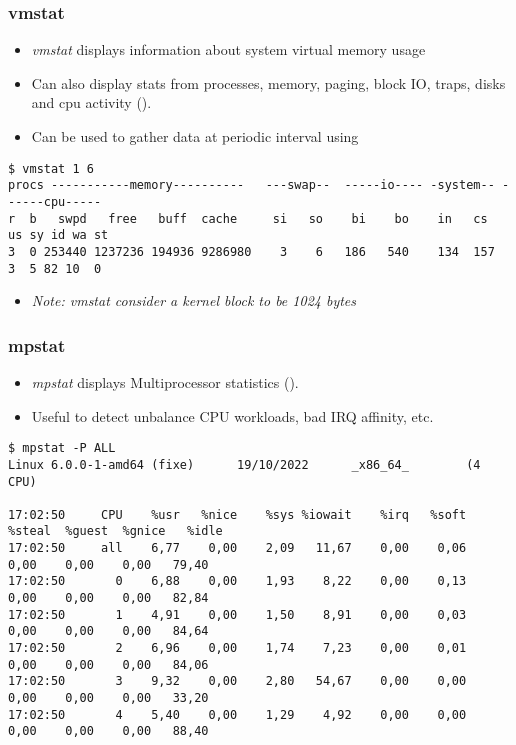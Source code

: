 \begin{frame}[fragile]
  \frametitle{vmstat}
  \begin{itemize}
    \item {\em vmstat} displays information about system virtual memory usage
    \item Can also display stats from processes, memory, paging, block IO,
          traps, disks and cpu activity ().
    \item Can be used to gather data at periodic interval using 
  \end{itemize}
  \begin{block}{}
    \begin{verbatim}
$ vmstat 1 6
procs -----------memory----------   ---swap--  -----io---- -system-- ------cpu-----
r  b   swpd   free   buff  cache     si   so    bi    bo    in   cs  us sy id wa st
3  0 253440 1237236 194936 9286980    3    6   186   540    134  157  3  5 82 10  0
    \end{verbatim}
  \end{block}
  \begin{itemize}
    \item {\em Note: vmstat consider a kernel block to be 1024 bytes}
  \end{itemize}
\end{frame}

\begin{frame}[fragile]
  \frametitle{mpstat}
  \begin{itemize}
    \item {\em mpstat} displays Multiprocessor statistics ().
    \item Useful to detect unbalance CPU workloads, bad IRQ affinity, etc.
  \end{itemize}
  \begin{block}{}
    \begin{verbatim}
$ mpstat -P ALL 
Linux 6.0.0-1-amd64 (fixe)      19/10/2022      _x86_64_        (4 CPU)

17:02:50     CPU    %usr   %nice    %sys %iowait    %irq   %soft  %steal  %guest  %gnice   %idle
17:02:50     all    6,77    0,00    2,09   11,67    0,00    0,06    0,00    0,00    0,00   79,40
17:02:50       0    6,88    0,00    1,93    8,22    0,00    0,13    0,00    0,00    0,00   82,84
17:02:50       1    4,91    0,00    1,50    8,91    0,00    0,03    0,00    0,00    0,00   84,64
17:02:50       2    6,96    0,00    1,74    7,23    0,00    0,01    0,00    0,00    0,00   84,06
17:02:50       3    9,32    0,00    2,80   54,67    0,00    0,00    0,00    0,00    0,00   33,20
17:02:50       4    5,40    0,00    1,29    4,92    0,00    0,00    0,00    0,00    0,00   88,40
    \end{verbatim}
  \end{block}
\end{frame}


